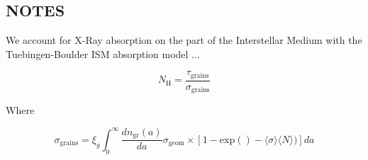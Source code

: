 \documentclass[fleqn,usenatbib]{mnras}
\begin{document}
\subsection*{NOTES}

We account for X-Ray absorption on the part of the Interstellar Medium with the Tuebingen-Boulder ISM absorption model ... %



\begin{equation}
    N_\mathrm{H}=\frac{\tau_{\mathrm{grains}}}{\sigma_{\mathrm{grains}}}
\end{equation}

Where 

\begin{equation}
    \sigma_{\mathrm{grains}}=\xi_g\int_0^{\infty}\frac{dn_{\mathrm{gr}}(a)}{da}\sigma_{\mathrm{geom}}\times[1-\mathrm{exp}()-\langle \sigma\rangle \langle N \rangle)]da
\end{equation}

\end{document}
